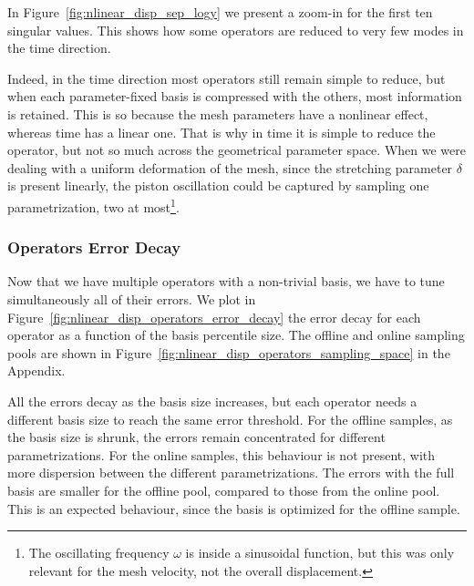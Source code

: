 \documentclass[../../thesis.tex]{subfiles}
\begin{document}
In Figure~\ref{fig:nlinear_disp_sep_logy} we present 
a zoom-in for the first ten singular values.
This shows how some operators are reduced 
to very few modes in the time direction.

Indeed, in the time direction most operators still remain simple to reduce, 
but when each parameter-fixed basis is compressed with the others,
most information is retained.
This is so because the mesh parameters have a nonlinear effect, 
whereas time has a linear one.
That is why in time it is simple to reduce the operator,
but not so much across the geometrical parameter space.
When we were dealing with a uniform deformation of the mesh,
since the stretching parameter $\delta$ is present linearly,
the piston oscillation could be captured by sampling one parametrization,
two at most\footnote{The oscillating frequency $\omega$ is inside a sinusoidal function,
but this was only relevant for the mesh velocity, 
not the overall displacement.}.

\subsubsection{Operators Error Decay}
Now that we have multiple operators with a non-trivial basis, 
we have to tune simultaneously all of their errors.
We plot in Figure~\ref{fig:nlinear_disp_operators_error_decay}
the error decay for each operator as a function of the basis percentile size.
The offline and online sampling pools are shown in
Figure~\ref{fig:nlinear_disp_operators_sampling_space} in the Appendix.

All the errors decay as the basis size increases, 
but each operator needs a different basis size to reach the same error threshold.
For the offline samples, as the basis size is shrunk, 
the errors remain concentrated for different parametrizations.
For the online samples, this behaviour is not present, 
with more dispersion between the different parametrizations.
The errors with the full basis are smaller for the offline pool, 
compared to those from the online pool.
This is an expected behaviour, 
since the basis is optimized for the offline sample.
\end{document}
